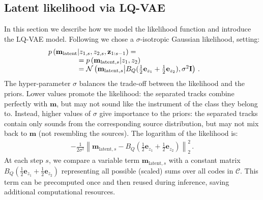 \documentclass[a4paper]{article}
\begin{document}
\subsection{Latent likelihood via LQ-VAE} \label{sec:likelihood}
 In this section we describe how we model the likelihood function and introduce the LQ-VAE model. Following \cite{jayaram2020} we chose a $\sigma$-isotropic Gaussian likelihood, setting:
\begin{equation}
         \begin{array}{ll}
              \hspace{-0.8cm}p\left(\mathbf{m}_{\text{latent}}|z_{1,s},z_{2,s}, \mathbf{z}_{1:s-1}\right)  = \\ \hspace{0.7cm}= p\left(\mathbf{m}_{\text{latent},s}|z_{1},z_{2}\right)  \\ \hspace{0.7cm} = \label{eq:latent_likelihood}\mathcal{N}\left(\mathbf{m}_{\text{latent},s}\big| B_Q(\tfrac{1}{2}\mathbf{e}_{z_{1}} + \tfrac{1}{2}\mathbf{e}_{z_{2}}), \sigma^2 \mathbf{I}\right) \,.
          \end{array}
\end{equation}
The hyper-parameter $\sigma$ balances the trade-off between the likelihood and the priors. Lower values promote the likelihood: the separated tracks combine perfectly with $\mathbf{m}$, but may not sound like the instrument of the class they belong to. Instead, higher values of $\sigma$ give importance to the priors: the separated tracks contain only sounds from the corresponding source distribution, but may not mix back to $\mathbf{m}$ (not resembling the sources).
The logarithm of the likelihood is: \begin{align}
               -\frac{1}{2\sigma^2}\left\lVert \mathbf{m}_{\text{latent},s} - B_Q\left(\tfrac{1}{2} \mathbf{e}_{z_{1}} + \tfrac{1}{2}\mathbf{e}_{z_{2}}\right) \right\rVert^2_2\,.
               \label{eq:sei}
           \end{align}
At each step $s$, we compare a variable term $\mathbf{m}_{\text{latent},s}$ with a constant matrix $B_Q\left(\tfrac{1}{2} \mathbf{e}_{z_{1}} + \tfrac{1}{2}\mathbf{e}_{z_{2}}\right)$ representing all possible (scaled) sums over all codes in $\mathcal{C}$. This term can be precomputed once and then reused during inference, saving additional computational resources.
\end{document}

